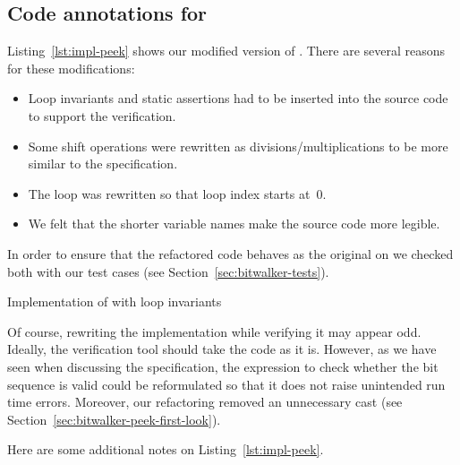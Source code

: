 \clearpage

\subsection{Code annotations for \peek}
\label{sec:peek-loop-invariants}

Listing~\ref{lst:impl-peek} shows our modified version of \peek.
There are several reasons for these modifications:

\begin{itemize}
\item Loop invariants and static assertions had to be inserted into
      the source code to support the verification.
\item Some shift operations were rewritten as divisions\slash multiplications
      to be more similar to the specification.
\item The loop was rewritten so that loop index starts at~0.
\item We felt that the shorter variable names make the source code more legible.
\end{itemize}

In order to ensure that the refactored code behaves as the original
on we checked both with our test cases (see Section~\ref{sec:bitwalker-tests}).

\begin{listing}[hbt]
\begin{minipage}{\textwidth}

\end{minipage}
\caption{\label{lst:impl-peek} Implementation of \peek with \acsl loop invariants}
\end{listing}


Of course, rewriting the implementation while verifying it may appear odd.
Ideally, the verification tool should take the code as it is.
However, as we have seen when discussing the specification, the
expression to check whether the bit sequence is valid
could be reformulated so that it does not raise unintended run time errors.
Moreover, our refactoring removed an unnecessary cast (see 
Section~\ref{sec:bitwalker-peek-first-look}).

Here are some additional notes on Listing~\ref{lst:impl-peek}.

